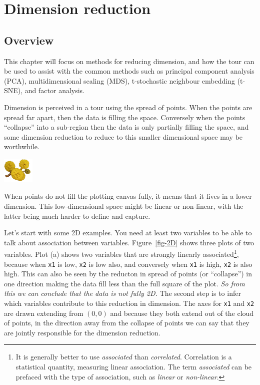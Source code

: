 \documentclass[
  letterpaper,
]{krantz}
\newcommand{\infobox}[1]{%
\noindent\colorbox{info!30}{%
\begin{minipage}{0.98\linewidth}%
    \centering%
    \begin{minipage}[c]{0.15\linewidth} %
      \includegraphics[width=1.5cm]{images/mulga-flowers2.png} %
    \end{minipage}%
    \hfill %
    \begin{minipage}[c]{0.8\linewidth} %
      \bigskip%
      \textsf{#1}%
      \bigskip%
    \end{minipage}%
    \hspace*{3mm}%
  \end{minipage}%
}%
}
\begin{document}
\part{Dimension reduction}

\hypertarget{sec-dimension-overview}{%
\chapter{Overview}\label{sec-dimension-overview}}

This chapter will focus on methods for reducing dimension, and how the
tour can be used to assist with the common methods such as principal
component analysis (PCA), multidimensional scaling (MDS), t-stochastic
neighbour embedding (t-SNE), and factor analysis.

Dimension is perceived in a tour using the spread of points. When the
points are spread far apart, then the data is filling the space.
Conversely when the points ``collapse'' into a sub-region then the data
is only partially filling the space, and some dimension reduction to
reduce to this smaller dimensional space may be worthwhile.

\infobox{When points do not fill the plotting canvas fully, it means that it lives in a lower dimension. This low-dimensional space might be linear or non-linear, with the latter being much harder to define and capture.}

Let's start with some 2D examples. You need at least two variables to be
able to talk about association between variables. Figure~\ref{fig-2D}
shows three plots of two variables. Plot (a) shows two variables that
are strongly linearly associated\footnote{It is generally better to use
  \emph{associated} than \emph{correlated}. Correlation is a statistical
  quantity, measuring linear association. The term \emph{associated} can
  be prefaced with the type of association, such as \emph{linear} or
  \emph{non-linear}.}, because when \texttt{x1} is low, \texttt{x2} is
low also, and conversely when \texttt{x1} is high, \texttt{x2} is also
high. This can also be seen by the reducton in spread of points (or
``collapse'') in one direction making the data fill less than the full
square of the plot. \emph{So from this we can conclude that the data is
not fully 2D.} The second step is to infer which variables contribute to
this reduction in dimension. The axes for \texttt{x1} and \texttt{x2}
are drawn extending from \((0,0)\) and because they both extend out of
the cloud of points, in the direction away from the collapse of points
we can say that they are jointly responsible for the dimension
reduction.
\end{document}
